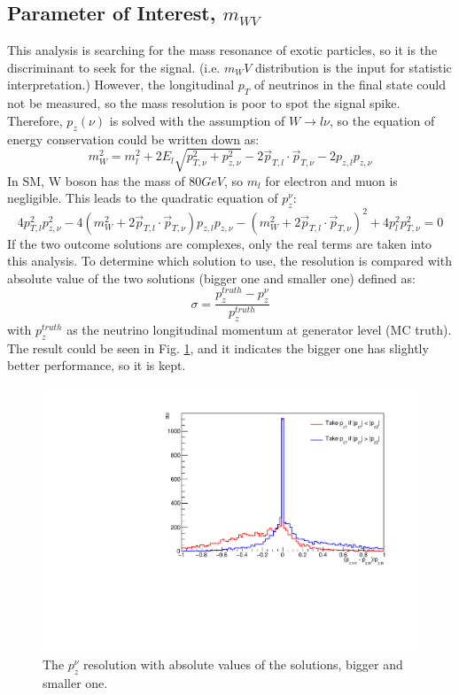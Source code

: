 \subsection{Parameter of Interest, $m_{WV}$}
This analysis is searching for the mass resonance of exotic particles, so it is the discriminant to seek for the signal. (i.e. $m_WV$ distribution is the input for statistic interpretation.) However, the longitudinal $p_{T}$ of neutrinos in the final state could not be measured, so the mass resolution is poor to spot the signal spike. Therefore, $p_{z}(\nu)$ is solved with the assumption of $W\rightarrow l\nu$, so the equation of energy conservation could be written down as:
\begin{equation}
m^2_W = m_{l}^{2} + 2E_{l}\sqrt{ p_{T,\nu}^2 + p_{z,\nu}^{2} }  - 2 \vec{p}_{{T},l} \cdot \vec{p}_{T, \nu} - 2 p_{z, l} p_{z,\nu}
\end{equation}
\noindent
In SM, W boson has the mass of $80GeV$, so $m_{l}$ for electron and muon is negligible. This leads to the quadratic equation of $p_{z}^\nu$:
\begin{equation}
4p_{{T}, l}^{2} p_{z,\nu}^{2} - 4 \left( m_{W}^{2} + 2 \vec{p}_{{T}, l} \cdot \vec{p}_{{T},\nu} \right) p_{z,l} p_{z, \nu} - \left( m_{W}^{2} + 2\vec{p}_{{T}, l} \cdot \vec{p}_{{T},\nu}  \right)^{2} +4p_l^{2} p_{{T},\nu}^{2} = 0
\end{equation}
\noindent
If the two outcome solutions are complexes, only the real terms are taken into this analysis. To determine which solution to use, the resolution is compared with absolute value of the two solutions (bigger one and smaller one) defined as:
\begin{equation}
\sigma = \frac{p_z^{truth}-p_z^{\nu}}{p_z^{truth}}
\end{equation}
\noindent
with $p_z^{truth}$ as the neutrino longitudinal momentum at generator level (MC truth). The result could be seen in Fig. \ref{Fig:netrinoPz}, and it indicates the bigger one has slightly better performance, so it is kept.  
\begin{figure}
	\centering
    \includegraphics[width=0.5\hsize]{Chapter3/neutrinoPz}
    \caption{The $p_{z}^\nu$ resolution with absolute values of the solutions, bigger and smaller one. }
    \label{Fig:netrinoPz}
\end{figure}
